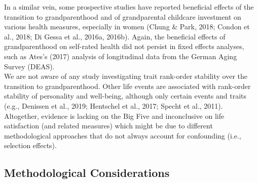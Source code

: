 \documentclass[
  english,
  man,floatsintext]{apa7}
\begin{document}
In a similar vein, some prospective studies have reported beneficial effects of the transition to grandparenthood and of grandparental childcare investment on various health measures, especially in women (Chung \& Park, 2018; Condon et al., 2018; Di Gessa et al., 2016a, 2016b). Again, the beneficial effects of grandparenthood on self-rated health did not persist in fixed effects analyses, such as Ates's (2017) analysis of longitudinal data from the German Aging Survey (DEAS).\\
We are not aware of any study investigating trait rank-order stability over the transition to grandparenthood. Other life events are associated with rank-order stability of personality and well-being, although only certain events and traits (e.g., Denissen et al., 2019; Hentschel et al., 2017; Specht et al., 2011). Altogether, evidence is lacking on the Big Five and inconclusive on life satisfaction (and related measures) which might be due to different methodological approaches that do not always account for confounding (i.e., selection effects).

\hypertarget{methodological-considerations}{%
\subsection{Methodological Considerations}\label{methodological-considerations}}
\end{document}
